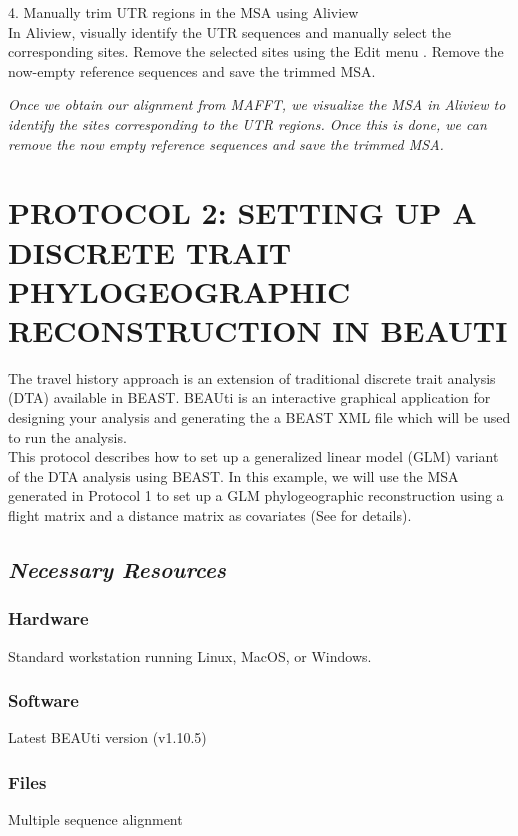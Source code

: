 \documentclass{article}
\newcommand{\ann}[1]{
\begin{adjustwidth}{0.5cm}{}
\it{#1}\\
\end{adjustwidth}}
\begin{document}
4. Manually trim UTR regions in the MSA using Aliview\\

In Aliview, visually identify the UTR sequences and manually select the corresponding sites. Remove the selected sites using the Edit menu    . Remove the now-empty reference sequences and save the trimmed MSA.\\

\ann{Once we obtain our alignment from MAFFT, we visualize the MSA in Aliview to identify the sites corresponding to the UTR regions.  Once this is done, we can remove the now empty reference sequences and save the trimmed MSA.}

\section*{PROTOCOL 2: SETTING UP A DISCRETE TRAIT PHYLOGEOGRAPHIC RECONSTRUCTION IN BEAUTI}

The travel history approach is an extension of traditional discrete trait analysis (DTA) available in BEAST. BEAUti is an interactive graphical application for designing your analysis and generating the a BEAST XML file which will be used to run the analysis. \\ 

This protocol describes how to set up a generalized linear model (GLM) variant of the DTA analysis using BEAST. In this example, we will use the MSA generated in Protocol 1 to set up a GLM phylogeographic reconstruction using a flight matrix and a distance matrix as covariates (See \cite{travhist} for details).

\subsection*{\textbf{\textit{Necessary Resources}}}
\subsubsection*{Hardware}
\hspace{0.5cm}Standard workstation running Linux, MacOS, or Windows. 

\subsubsection*{Software}
\hspace{0.5cm}Latest BEAUti version (v1.10.5)

\subsubsection*{Files}
\hspace{0.5cm}Multiple sequence alignment
\end{document}
